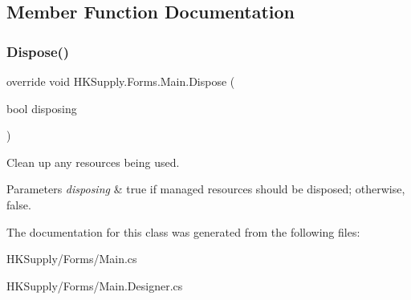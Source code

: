\subsection{Member Function Documentation}
\mbox{\label{class_h_k_supply_1_1_forms_1_1_main_a99fe43d79c789818b37bb46db1dfa795}} 
\subsubsection{\texorpdfstring{Dispose()}{Dispose()}}
{\footnotesize\ttfamily override void H\+K\+Supply.\+Forms.\+Main.\+Dispose (\begin{DoxyParamCaption}\item[{bool}]{disposing }\end{DoxyParamCaption})\hspace{0.3cm}{\ttfamily [protected]}}



Clean up any resources being used. 


\begin{DoxyParams}{Parameters}
{\em disposing} & true if managed resources should be disposed; otherwise, false.\\
\hline
\end{DoxyParams}


The documentation for this class was generated from the following files\+:\begin{DoxyCompactItemize}
\item 
H\+K\+Supply/\+Forms/Main.\+cs\item 
H\+K\+Supply/\+Forms/Main.\+Designer.\+cs\end{DoxyCompactItemize}
